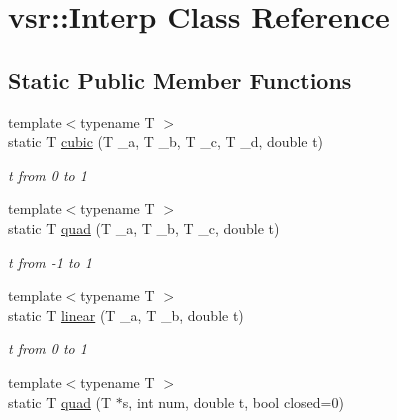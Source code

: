 \hypertarget{classvsr_1_1_interp}{\section{vsr\-:\-:Interp Class Reference}
\label{classvsr_1_1_interp}
}
\subsection*{Static Public Member Functions}
\begin{DoxyCompactItemize}
\item 
\hypertarget{classvsr_1_1_interp_a882e636db68b4b93ea8d984913f75e74}{{\footnotesize template$<$typename T $>$ }\\static T \hyperlink{classvsr_1_1_interp_a882e636db68b4b93ea8d984913f75e74}{cubic} (T \-\_\-a, T \-\_\-b, T \-\_\-c, T \-\_\-d, double t)}\label{classvsr_1_1_interp_a882e636db68b4b93ea8d984913f75e74}

\begin{DoxyCompactList}\small\item\em t from 0 to 1 \end{DoxyCompactList}\item 
\hypertarget{classvsr_1_1_interp_abeaf252ef379aa352d1a2bfdc405b5c6}{{\footnotesize template$<$typename T $>$ }\\static T \hyperlink{classvsr_1_1_interp_abeaf252ef379aa352d1a2bfdc405b5c6}{quad} (T \-\_\-a, T \-\_\-b, T \-\_\-c, double t)}\label{classvsr_1_1_interp_abeaf252ef379aa352d1a2bfdc405b5c6}

\begin{DoxyCompactList}\small\item\em t from -\/1 to 1 \end{DoxyCompactList}\item 
\hypertarget{classvsr_1_1_interp_a2224022b21138a5c626a112d7d0e384f}{{\footnotesize template$<$typename T $>$ }\\static T \hyperlink{classvsr_1_1_interp_a2224022b21138a5c626a112d7d0e384f}{linear} (T \-\_\-a, T \-\_\-b, double t)}\label{classvsr_1_1_interp_a2224022b21138a5c626a112d7d0e384f}

\begin{DoxyCompactList}\small\item\em t from 0 to 1 \end{DoxyCompactList}\item 
\hypertarget{classvsr_1_1_interp_aa566a7c9e4ea4d0bd24dcaac43971319}{{\footnotesize template$<$typename T $>$ }\\static T \hyperlink{classvsr_1_1_interp_aa566a7c9e4ea4d0bd24dcaac43971319}{quad} (T $\ast$s, int num, double t, bool closed=0)}\label{classvsr_1_1_interp_aa566a7c9e4ea4d0bd24dcaac43971319}


\end{DoxyCompactItemize}
